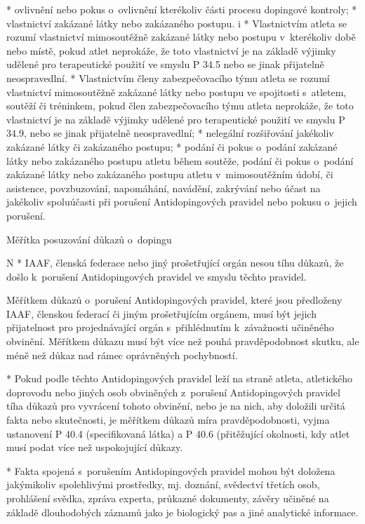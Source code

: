   * ovlivnění nebo pokus o~ovlivnění kterékoliv části procesu dopingové kontroly;
  * vlastnictví zakázané látky nebo zakázaného postupu.
    \begitems \style i
    * Vlastnictvím atleta se rozumí vlastnictví mimosoutěžně zakázané látky nebo postupu v~kterékoliv době nebo místě, pokud atlet neprokáže, že toto vlastnictví je na základě výjimky udělené pro terapeutické použití ve smyslu P 34.5 nebo se jinak přijatelně neospravedlní.
    * Vlastnictvím členy zabezpečovacího týmu atleta se rozumí vlastnictví mimosoutěžně zakázané látky nebo postupu ve spojitosti s~atletem, soutěží či tréninkem, pokud člen zabezpečovacího týmu atleta neprokáže, že toto vlastnictví je na základě výjimky udělené pro terapeutické použití ve smyslu P 34.9, nebo se jinak přijatelně neospravedlní;
    \enditems
  * nelegální rozšiřování jakékoliv zakázané látky či zakázaného postupu;
  * podání či pokus o~podání zakázané látky nebo zakázaného postupu atletu během soutěže, podání či pokus o~podání zakázané látky nebo zakázaného postupu atletu v~mimosoutěžním údobí, či asistence, povzbuzování, napomáhání, navádění, zakrývání nebo účast na jakékoliv spoluúčasti při porušení Antidopingových pravidel nebo pokusu o~jejich porušení.
  \enditems
\enditems

\secc Měřítka posuzování důkazů o~dopingu

\begitems \style N
* IAAF, členská federace nebo jiný prošetřující orgán nesou tíhu důkazů, že došlo k~porušení Antidopingových pravidel ve smyslu těchto pravidel.

Měřítkem důkazů o~porušení Antidopingových pravidel, které jsou předloženy IAAF, členskou federací či jiným prošetřujícím orgánem, musí být jejich přijatelnost pro projednávající orgán s~přihlédnutím k~závažnosti učiněného obvinění. Měřítkem důkazu musí být více než pouhá pravděpodobnost skutku, ale méně než důkaz nad rámec oprávněných pochybností.

* Pokud podle těchto Antidopingových pravidel leží na straně atleta, atletického doprovodu nebo jiných osob obviněných z~porušení Antidopingových pravidel tíha důkazů pro vyvrácení tohoto obvinění, nebo je na nich, aby doložili určitá fakta nebo skutečnosti, je měřítkem důkazů míra pravděpodobnosti, vyjma ustanovení P 40.4 (specifikovaná látka) a P 40.6 (přitěžující okolnosti, kdy atlet musí podat více než uspokojující důkazy.

* Fakta spojená s~porušením Antidopingových pravidel mohou být doložena jakýmikoliv spolehlivými prostředky, mj. doznání, svědectví třetích osob, prohlášení svědka, zpráva experta, průkazné dokumenty, závěry učiněné na základě dlouhodobých záznamů jako je biologický pas a jiné analytické informace.

